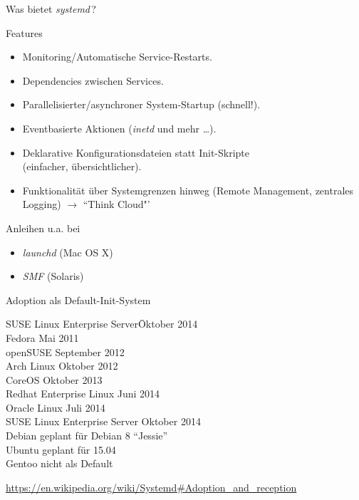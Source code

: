 \begin{frame}{Was bietet \emph{systemd}\,?}
\begin{block}{Features}
\begin{itemize}
\item Monitoring/Automatische Service-Restarts.
\item Dependencies zwischen Services.
\item Parallelisierter/asynchroner System-Startup (schnell!).
\item Eventbasierte Aktionen (\emph{inetd} und mehr \dots).
\item Deklarative Konfigurationsdateien statt Init-Skripte\\ (einfacher,
übersichtlicher).
\item Funktionalität über Systemgrenzen hinweg (Remote Management,
zentrales Logging) $\rightarrow$ ``Think Cloud"'
\end{itemize}
\end{block}

\begin{block}{Anleihen u.a. bei}
\begin{itemize}
\item \emph{launchd} (Mac OS X)
\item \emph{SMF} (Solaris)
\end{itemize}
\end{block}
\end{frame}


\begin{frame}[fragile]{Adoption als Default-Init-System}
\begin{tabbing}
SUSE Linux Enterprise Server\quad \= Oktober 2014 \kill\\
Fedora \> Mai 2011 \\
openSUSE \> September 2012 \\
Arch Linux \> Oktober 2012 \\
CoreOS \> Oktober 2013 \\
Redhat Enterprise Linux \> Juni 2014 \\
Oracle Linux \> Juli 2014 \\
SUSE Linux Enterprise Server \> Oktober 2014 \\[1ex]
Debian \> geplant für Debian 8 ``Jessie'' \\
Ubuntu \> geplant für 15.04\\[1ex]
Gentoo \> nicht als Default
\end{tabbing}
\vspace*{1ex}
\hfill{\footnotesize\url{https://en.wikipedia.org/wiki/Systemd#Adoption_and_reception}}
\end{frame}


